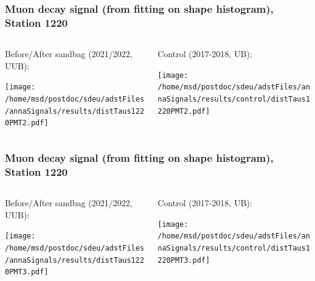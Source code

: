 \documentclass[aspectratio=169]{beamer}
\begin{document}
\begin{frame}
  \frametitle{Muon decay signal (from fitting on shape histogram), Station 1220}
  
  \begin{columns}[T,c]
    \begin{column}{.5\textwidth}
      Before/After sandbag (2021/2022, UUB):
      \vspace{.3cm}

      \texttt{[image: /home/msd/postdoc/sdeu/adstFiles/annaSignals/results/distTaus1220PMT2.pdf]}
    \end{column}
    \begin{column}{.5\textwidth}
      Control (2017-2018, UB):
      \vspace{0.3cm}

      \texttt{[image: /home/msd/postdoc/sdeu/adstFiles/annaSignals/results/control/distTaus1220PMT2.pdf]}
    \end{column}    
\end{columns}
\end{frame}

\begin{frame}
  \frametitle{Muon decay signal (from fitting on shape histogram), Station 1220}
  
  \begin{columns}[T,c]
    \begin{column}{.5\textwidth}
      Before/After sandbag (2021/2022, UUB):
      \vspace{.3cm}

      \texttt{[image: /home/msd/postdoc/sdeu/adstFiles/annaSignals/results/distTaus1220PMT3.pdf]}
    \end{column}
    \begin{column}{.5\textwidth}
      Control (2017-2018, UB):
      \vspace{0.3cm}

      \texttt{[image: /home/msd/postdoc/sdeu/adstFiles/annaSignals/results/control/distTaus1220PMT3.pdf]}
    \end{column}    
\end{columns}
\end{frame}


\end{document}
